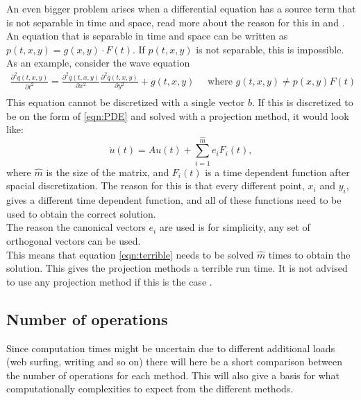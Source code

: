 An even bigger problem arises when a differential equation has a source term that is not separable in time and space, read more about the reason for this in \cite{elena} and \citep{min}. An equation that is separable in time and space can be written as $p(t,x,y) = g(x,y) \cdot F(t)$. If $p(t,x,y)$ is not separable, this is impossible. As an example, consider the wave equation
\begin{equation*}
\begin{aligned}
\frac{\partial^2 q(t,x,y)}{\partial t^2} = \frac{\partial^2 q(t,x,y)}{\partial x^2 } \frac{\partial^2 q(t,x,y)}{\partial y^2 } + g(t,x,y) \quad \text{ where } g(t,x,y) \neq p(x,y) F(t) \\
\end{aligned}
\end{equation*}
This equation cannot be discretized with a single vector $b$. If this is discretized to be on the form of \eqref{eqn:PDE} and solved with a projection method, it would look like:
\begin{equation*} \label{eqn:terrible}
\dot{u}(t) = A u(t) + \sum \limits_{i = 1}^{\hat{m}} e_i F_i(t),
\end{equation*}
where $\hat{m}$ is the size of the matrix, and $F_i(t)$ is a time dependent function after spacial discretization. The reason for this is that every different point, $x_i$ and $y_i$, gives a different time dependent function, and all of these functions need to be used to obtain the correct solution. \\
The reason the canonical vectors $e_i$ are used is for simplicity, any set of orthogonal vectors can be used. \\
This means that equation \eqref{eqn:terrible} needs to be solved $\hat{m}$ times to obtain the solution. This gives the projection methods a terrible run time. It is not advised  to use any projection method if this is the case \cite{min}.
\newpage


\subsection{Number of operations}%
Since computation times might be uncertain due to different additional loads (web surfing, writing and so on) there will here be a short comparison between the number of operations for each method. This will also give a basis for what computationally complexities to expect from the different methods.\\

